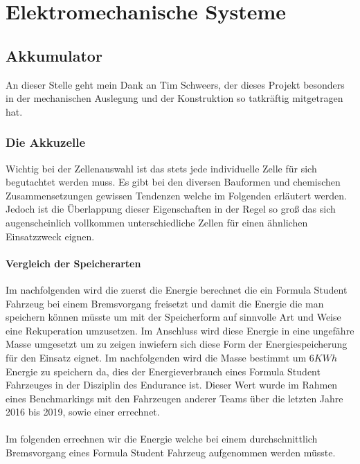 
\chapter{Elektromechanische Systeme}

\section{Akkumulator}
An dieser Stelle geht mein Dank an Tim Schweers, der dieses Projekt besonders in der mechanischen Auslegung und der Konstruktion so tatkräftig mitgetragen hat.

\subsection{Die Akkuzelle}

Wichtig bei der Zellenauswahl ist das stets jede individuelle Zelle für sich begutachtet werden muss. Es gibt bei den diversen Bauformen und chemischen Zusammensetzungen gewissen Tendenzen welche im Folgenden erläutert werden. Jedoch ist die Überlappung dieser Eigenschaften in der Regel so groß das sich augenscheinlich vollkommen unterschiedliche Zellen für einen ähnlichen Einsatzzweck eignen.
\FloatBarrier
\subsubsection{Vergleich der Speicherarten}

Im nachfolgenden wird die zuerst die Energie berechnet die ein Formula Student Fahrzeug bei einem Bremsvorgang freisetzt und damit die Energie die man speichern können müsste um mit der Speicherform auf sinnvolle Art und Weise eine Rekuperation umzusetzen. Im Anschluss wird diese Energie in eine ungefähre Masse umgesetzt um zu zeigen inwiefern sich diese Form der Energiespeicherung für den Einsatz eignet. Im nachfolgenden wird die Masse bestimmt um \ensuremath{6 KWh} Energie zu speichern da, dies der Energieverbrauch eines Formula Student Fahrzeuges in der Disziplin des Endurance ist. Dieser Wert wurde im Rahmen eines Benchmarkings mit den Fahrzeugen anderer Teams über die letzten Jahre 2016 bis 2019, sowie einer  errechnet.
\\
\\
Im folgenden errechnen wir die Energie welche bei einem durchschnittlich Bremsvorgang eines Formula Student Fahrzeug aufgenommen werden müsste. 

